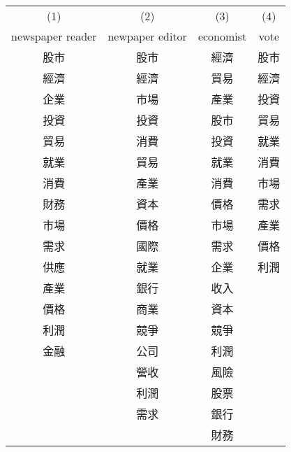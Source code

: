 {
\def\sym#1{\ifmmode^{#1}\else\(^{#1}\)\fi}
\begin{tabular}{c c c c}
\hline\hline

\multicolumn{1}{c}{(1)}
&\multicolumn{1}{c}{(2)}
&\multicolumn{1}{c}{(3)}
&\multicolumn{1}{c}{(4)}
\\

\multicolumn{1}{c}{newspaper reader}
&\multicolumn{1}{c}{newpaper editor}
&\multicolumn{1}{c}{economist}
&\multicolumn{1}{c}{vote}
\\
\hline
股市 & 股市 & 經濟 & 股市 \\
經濟 & 經濟 & 貿易 & 經濟 \\
企業 & 市場 & 產業 & 投資 \\
投資 & 投資 & 股市 & 貿易 \\
貿易 & 消費 & 投資 & 就業 \\
就業 & 貿易 & 就業 & 消費 \\
消費 & 產業 & 消費 & 市場 \\
財務 & 資本 & 價格 & 需求 \\
市場 & 價格 & 市場 & 產業 \\
需求 & 國際 & 需求 & 價格 \\
供應 & 就業 & 企業 & 利潤 \\
產業 & 銀行 & 收入 &  \\
價格 & 商業 & 資本 &  \\
利潤 & 競爭 & 競爭 &  \\
金融 & 公司 & 利潤 &  \\
 & 營收 & 風險 &  \\
 & 利潤 & 股票 &  \\
 & 需求 & 銀行 &  \\
 &  & 財務 &  \\
\hline\hline
\end{tabular}
}

